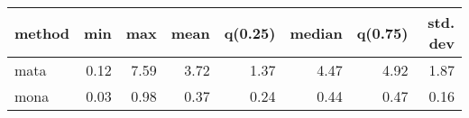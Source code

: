 \begin{tabular}{lrrrrrrr}
\hline
 method   &   min &   max &   mean &   q(0.25) &   median &   q(0.75) &   std. dev \\
\hline
 mata     &  0.12 &  7.59 &   3.72 &      1.37 &     4.47 &      4.92 &       1.87 \\
 mona     &  0.03 &  0.98 &   0.37 &      0.24 &     0.44 &      0.47 &       0.16 \\
\hline
\end{tabular}
